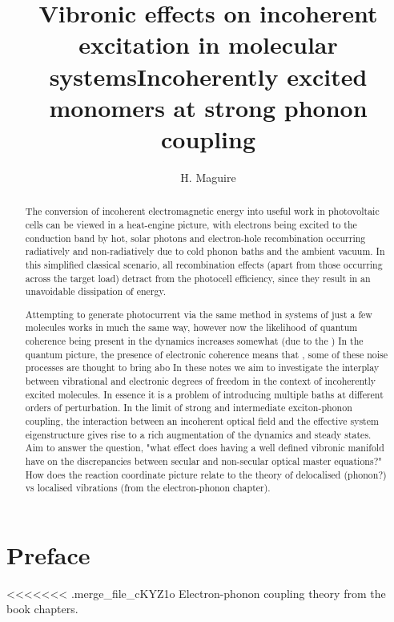 \documentclass[]{article}
\title{Vibronic effects on incoherent excitation in molecular systems}
\title{Incoherently excited monomers at strong phonon coupling}
\author[1]{H. Maguire}
\affil[1]{Photon Science Institute and School of Physics and Astronomy, The University of Manchester, Oxford Road,
	Manchester M13 9PL, United Kingdom}
\begin{document}
\tableofcontents
\section*{Preface}
<<<<<<< .merge_file_cKYZ1o
Electron-phonon coupling theory from the book chapters.
\maketitle
\begin{abstract}
The conversion of incoherent electromagnetic energy into useful work in photovoltaic cells can be viewed in a heat-engine picture, with electrons being excited to the conduction band by hot, solar photons and electron-hole recombination occurring radiatively and non-radiatively due to cold phonon baths and the ambient vacuum. In this simplified classical scenario, all recombination effects (apart from those occurring across the target load) detract from the photocell efficiency, since they result in an unavoidable dissipation of energy.

Attempting to generate photocurrent via the same method in systems of just a few molecules works in much the same way, however now the likelihood of quantum coherence being present in the dynamics increases somewhat (due to the ) In the quantum picture, the presence of electronic coherence means that , some of these noise processes are thought to bring abo
In these notes we aim to investigate the interplay between vibrational and electronic degrees of freedom in the context of incoherently excited molecules. In essence it is a problem of introducing multiple baths at different orders of perturbation. In the limit of strong and intermediate exciton-phonon coupling, the interaction between an incoherent optical field and the effective system eigenstructure gives rise to a rich augmentation of the dynamics and steady states. Aim to answer the question, "what effect does having a well defined vibronic manifold have on the discrepancies between secular and non-secular optical master equations?" How does the reaction coordinate picture relate to the theory of delocalised (phonon?) vs localised vibrations (from the electron-phonon chapter). 


\end{abstract}
\end{document}
